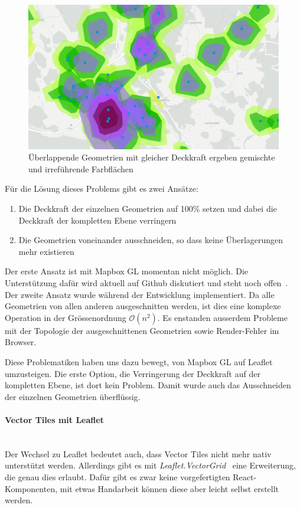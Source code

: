 \begin{figure}[ht]
    \centering
    \includegraphics[width=0.8\linewidth]{projectdoc/img/problem_overlapping_isochrones}
    \caption[Problematik von sich überlappenden Geometrien mit gleicher Deckkraf]{Überlappende Geometrien mit gleicher Deckkraft ergeben gemischte und irreführende Farbflächen}
    \label{fig:problem_overlapping_isochrones}
\end{figure}

Für die Lösung dieses Problems gibt es zwei Ansätze:

\begin{enumerate}
    \item Die Deckkraft der einzelnen Geometrien auf 100\% setzen und dabei die Deckkraft der kompletten Ebene verringern
    \item Die Geometrien voneinander ausschneiden, so dass keine Überlagerungen mehr existieren
\end{enumerate}

Der erste Ansatz ist mit Mapbox GL momentan nicht möglich.
Die Unterstützung dafür wird aktuell auf Github diskutiert und steht noch offen~\cite{mapbox_layer_opacity}.
Der zweite Ansatz wurde während der Entwicklung implementiert.
Da alle Geometrien von allen anderen ausgeschnitten werden, ist dies eine komplexe Operation in der Grössenordnung $\mathcal{O}(n^2)$.
Es enstanden ausserdem Probleme mit der Topologie der ausgeschnittenen Geometrien sowie Render-Fehler im Browser.

Diese Problematiken haben uns dazu bewegt, von Mapbox GL auf Leaflet umzusteigen.
Die erste Option, die Verringerung der Deckkraft auf der kompletten Ebene, ist dort kein Problem.
Damit wurde auch das Ausschneiden der einzelnen Geometrien überflüssig.

\paragraph{Vector Tiles mit Leaflet}~\\
Der Wechsel zu Leaflet bedeutet auch, dass Vector Tiles nicht mehr nativ unterstützt werden.
Allerdings gibt es mit \emph{Leaflet.VectorGrid}~\cite{leaflet_vector_grid} eine Erweiterung, die genau dies erlaubt.
Dafür gibt es zwar keine vorgefertigten React-Komponenten, mit etwas Handarbeit können diese aber leicht selbst erstellt werden.

